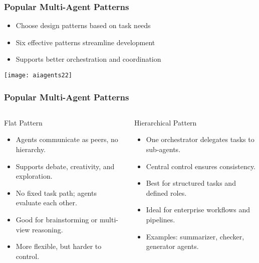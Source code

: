 \begin{frame}[fragile]\frametitle{Popular Multi-Agent Patterns}
    \begin{itemize}
        \item Choose design patterns based on task needs
        \item Six effective patterns streamline development
        \item Supports better orchestration and coordination
    \end{itemize}
	
\begin{center}
\texttt{[image: aiagents22]}
\end{center}		
	
\end{frame}

\begin{frame}[fragile]\frametitle{Popular Multi-Agent Patterns}

\begin{columns}
    \begin{column}[T]{0.6\linewidth}
		Flat Pattern
		  \begin{itemize}
			\item Agents communicate as peers, no hierarchy.
			\item Supports debate, creativity, and exploration.
			\item No fixed task path; agents evaluate each other.
			\item Good for brainstorming or multi-view reasoning.
			\item More flexible, but harder to control.
		  \end{itemize}	

    \end{column}
    \begin{column}[T]{0.4\linewidth}
		Hierarchical Pattern
		  \begin{itemize}
			\item One orchestrator delegates tasks to sub-agents.
			\item Central control ensures consistency.
			\item Best for structured tasks and defined roles.
			\item Ideal for enterprise workflows and pipelines.
			\item Examples: summarizer, checker, generator agents.
		  \end{itemize}	
    \end{column}
  \end{columns}
  
 
	
\end{frame}

